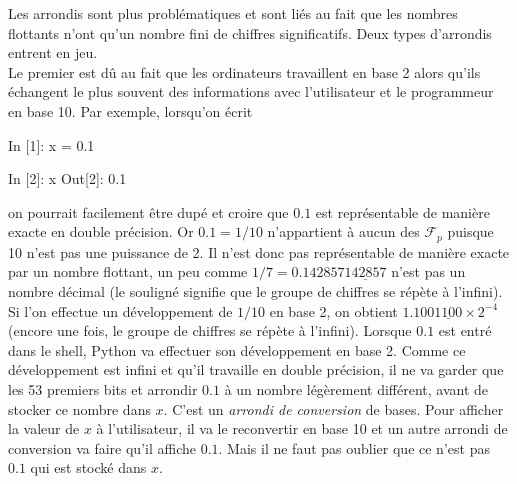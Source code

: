 \documentclass{magnoliaold}
\begin{document}
Les arrondis sont plus problématiques et sont liés au fait que les nombres
flottants n'ont qu'un nombre fini de chiffres significatifs. Deux types d'arrondis
entrent en jeu.\\

Le premier est dû au fait que les ordinateurs travaillent en base 2 alors qu'ils
échangent le plus souvent des informations avec l'utilisateur et le programmeur en base 10. Par exemple, lorsqu'on écrit
\begin{pythoncode}
In [1]: x = 0.1

In [2]: x
Out[2]: 0.1
\end{pythoncode}
on pourrait facilement être dupé et croire  que $0.1$ est représentable de
manière exacte en double précision. Or $0.1=1/10$ n'appartient à aucun des $\mathcal{F}_p$
puisque 10 n'est pas une puissance de 2. Il n'est donc pas représentable de manière exacte
par un nombre flottant, un peu comme $1/7=0.142857\underline{142857}$ n'est pas un nombre
décimal (le souligné signifie que le groupe de chiffres se répète à l'infini). Si l'on effectue un
développement de $1/10$ en base 2, on obtient $1.100\underline{1100} \times 2^{-4}$ (encore une fois, le groupe de chiffres se répète à l'infini).
Lorsque $0.1$ est entré dans le shell, Python va effectuer son développement en base
2. Comme ce développement est infini et qu'il travaille en double précision, il ne va garder que les 53 premiers bits
et arrondir $0.1$ à un nombre légèrement différent, avant de stocker ce nombre dans $x$. C'est un \emph{arrondi de conversion} de bases. Pour afficher
la valeur de $x$ à l'utilisateur, il va le reconvertir en base 10 et un autre arrondi de conversion
va faire qu'il affiche $0.1$. Mais il ne faut pas oublier que ce n'est pas $0.1$ qui est
stocké dans $x$.\\
\end{document}
